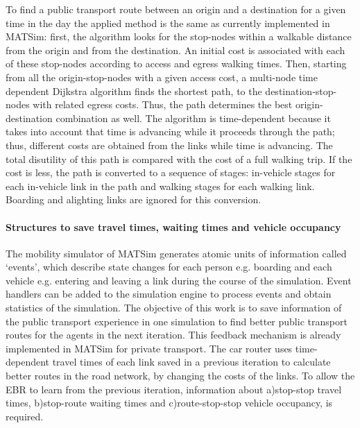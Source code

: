 To find a public transport route between an origin and a destination for a given time in the day the applied method is the same as currently implemented in MATSim: first, the algorithm looks for the stop-nodes within a walkable distance from the origin and from the destination. An initial cost is associated with each of these stop-nodes according to access and egress walking times. Then, starting from all the origin-stop-nodes with a given access cost, a multi-node time dependent Dijkstra algorithm finds the shortest path, to the destination-stop-nodes with related egress costs. Thus, the path determines the best origin-destination combination as well. The algorithm is time-dependent because it takes into account that time is advancing while it proceeds through the path; thus, different costs are obtained from the links while time is advancing. The total disutility of this path is compared with the cost of a full walking trip. If the cost is less, the path is converted to a sequence of stages: in-vehicle stages for each in-vehicle link in the path and walking stages for each walking link. Boarding and alighting links are ignored for this conversion.

\paragraph{Structures to save travel times, waiting times and vehicle occupancy} \label{subsec:Structures}

The mobility simulator of MATSim generates atomic units of information called `events', which describe state changes for each person e.g. boarding and each vehicle e.g. entering and leaving a link during the course of the simulation. Event handlers can be added to the simulation engine to process events and obtain statistics of the simulation. The objective of this work is to save information of the public transport experience in one simulation to find better public transport routes for the agents in the next iteration. This feedback mechanism is already implemented in MATSim for private transport. The car router uses time-dependent travel times of each link saved in a previous iteration to calculate better routes in the road network, by changing the costs of the links. To allow the EBR to learn from the previous iteration, information about a)stop-stop travel times, b)stop-route waiting times and c)route-stop-stop vehicle occupancy, is required.

